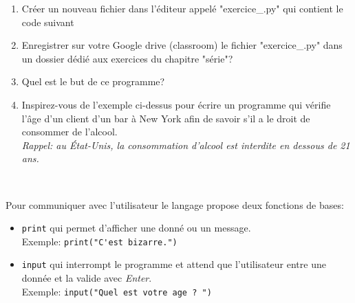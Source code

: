 \documentclass[a4paper,12pt]{article}
\newcommand{\numero}{0}                                    %
\begin{document}
	\begin{enumerate}
		\item Créer un nouveau fichier dans l'éditeur appelé "exercice\_\getexocompteur.py" qui contient le code suivant
		
		\item Enregistrer sur votre Google drive (classroom) le fichier "exercice\_\getexocompteur.py" dans un dossier dédié aux exercices du chapitre "série\thesection"?
		\item Quel est le but de ce programme?
		\item Inspirez-vous de l'exemple ci-dessus pour écrire un programme qui vérifie l'âge d'un client d'un bar à New York afin de savoir s'il a le droit de consommer de l'alcool.\\ \textit{Rappel: au État-Unis, la consommation d'alcool est interdite en dessous de 21 ans.}
	\end{enumerate}
	\begin{correction}
		~\\ \vspace{-5pt}
		
	\end{correction}
\finexo

\begin{apprendre}
	Pour communiquer avec l'utilisateur le langage \py propose deux fonctions de bases:
	\begin{itemize}
		\item \lstinline{print} qui permet d'afficher une donné ou un message.\\
		Exemple: \lstinline{print("C'est bizarre.")}
		\item \lstinline{input} qui interrompt le programme et attend que l'utilisateur entre une donnée et la valide avec \textit{Enter}.\\
		Exemple: \lstinline{input("Quel est votre age ? ")}
	\end{itemize}
\end{apprendre}


\cleardoublepage

		\newpage
		\setcounter{page}{1}
		\setcounter{section}{\numero}
		

		\section{}
	
\end{document}
